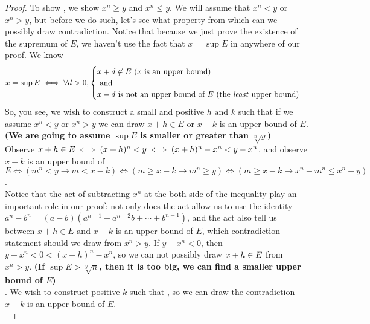 \documentclass{report}
\begin{document}
\begin{proof}
To show , we show $x^n\geq y$ and $x^n\leq y$. We will assume that $x^n<y$ or $x^n>y$, but before we do such, let's see what property from which can we possibly draw contradiction. Notice that because we just prove the existence of the supremum of $E$, we haven't use the fact that $x=\sup E$ in anywhere of our proof. We know
\begin{equation}
x=\sup E\iff \forall d>0,
\begin{cases}
x+d\not\in E\text{ ($x$ is an upper bound) }\\
\text{ and }\\
x-d \text{ is not an upper bound of $E$ (the \emph{least} upper bound)}
\end{cases}    
\end{equation}
So, you see, we wish to construct  a small and positive $h\text{ and }k$ such that if we assume $x^n<y\text{ or }x^n>y$ we can draw $x+h\in E$ or $x-k$ is an upper bound of $E$. \textbf{(We are going to assume $\sup E$ is smaller or greater than $\sqrt[n]{y}$)} \\

Observe $x+h\in E\iff (x+h)^n<y\iff (x+h)^n-x^n<y-x^n$, and observe $x-k$ is an upper bound of $E\iff (m^n<y\longrightarrow m<x-k)\iff (m\geq x-k\longrightarrow m^n\geq y)\iff (m\geq x-k\longrightarrow x^n-m^n\leq x^n-y)$.\\

Notice that the act of  subtracting  $x^n$ at the both side of the inequality play an important role in our proof: not only does the act allow us to use the identity $a^n-b^n=(a-b)(a^{n-1}+a^{n-2}b+\cdots +b^{n-1})$, and the act also tell us between $x+h \in E\text{ and }x-k$ is an upper bound of $E$, which contradiction statement should we draw from $x^n>y$. If $y-x^n<0$, then  $y-x^n<0<(x+h)^n-x^n$, so we can not possibly draw $x+h\in E$ from $x^n>y$. \textbf{(If $\sup E>\sqrt[y]{n}$, then it is too big, we can find a smaller upper bound of $E$)}\\

. We wish to construct positive $k$ such that , so we can draw the contradiction $x-k$ is an upper bound of $E$. \\ 


\end{proof}
\end{document}
